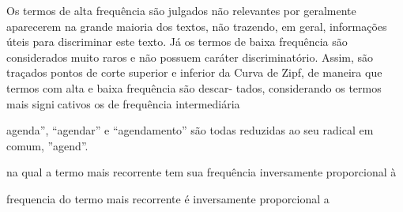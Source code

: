 











Os termos de alta frequência são julgados não relevantes por
geralmente aparecerem na grande maioria dos textos, não trazendo, em geral, informações
úteis para discriminar este texto. Já os termos de baixa frequência são considerados muito
raros e não possuem caráter discriminatório. Assim, são traçados pontos de corte superior
e inferior da Curva de Zipf, de maneira que termos com alta e baixa frequência são descar-
tados, considerando os termos mais signicativos os de frequência intermediária
























agenda”, “agendar” e “agendamento” 
são todas reduzidas ao seu radical em comum, ”agend”.  






na qual a termo mais recorrente tem sua frequência inversamente proporcional à



frequencia do termo mais recorrente é inversamente proporcional a






